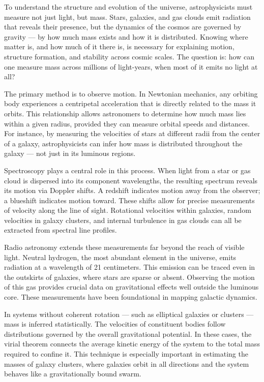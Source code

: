 To understand the structure and evolution of the universe, astrophysicists must measure not just light, but mass. Stars, galaxies, and gas clouds emit radiation that reveals their presence, but the dynamics of the cosmos are governed by gravity — by how much mass exists and how it is distributed. Knowing where matter is, and how much of it there is, is necessary for explaining motion, structure formation, and stability across cosmic scales. The question is: how can one measure mass across millions of light-years, when most of it emits no light at all?

The primary method is to observe motion. In Newtonian mechanics, any orbiting body experiences a centripetal acceleration that is directly related to the mass it orbits. This relationship allows astronomers to determine how much mass lies within a given radius, provided they can measure orbital speeds and distances. For instance, by measuring the velocities of stars at different radii from the center of a galaxy, astrophysicists can infer how mass is distributed throughout the galaxy — not just in its luminous regions.

Spectroscopy plays a central role in this process. When light from a star or gas cloud is dispersed into its component wavelengths, the resulting spectrum reveals its motion via Doppler shifts. A redshift indicates motion away from the observer; a blueshift indicates motion toward. These shifts allow for precise measurements of velocity along the line of sight. Rotational velocities within galaxies, random velocities in galaxy clusters, and internal turbulence in gas clouds can all be extracted from spectral line profiles.

Radio astronomy extends these measurements far beyond the reach of visible light. Neutral hydrogen, the most abundant element in the universe, emits radiation at a wavelength of 21 centimeters. This emission can be traced even in the outskirts of galaxies, where stars are sparse or absent. Observing the motion of this gas provides crucial data on gravitational effects well outside the luminous core. These measurements have been foundational in mapping galactic dynamics.

In systems without coherent rotation — such as elliptical galaxies or clusters — mass is inferred statistically. The velocities of constituent bodies follow distributions governed by the overall gravitational potential. In these cases, the virial theorem connects the average kinetic energy of the system to the total mass required to confine it. This technique is especially important in estimating the masses of galaxy clusters, where galaxies orbit in all directions and the system behaves like a gravitationally bound swarm.

